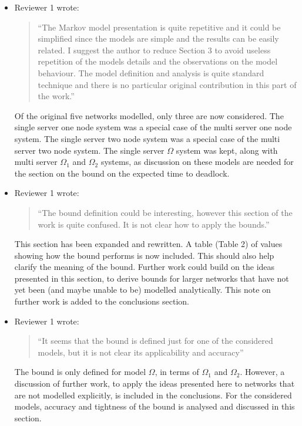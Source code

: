 \documentclass{article}
\begin{document}
\begin{itemize}

\item Reviewer 1 wrote:
\begin{quote}
``The Markov model presentation is quite repetitive and it could be simplified
since the models are simple and the results can be easily related.
I suggest the author to reduce Section 3 to avoid useless repetition of the
models details and the observations on the model behaviour.
The model definition and analysis is quite standard technique and there is no
particular original contribution in this part of the work.''
\end{quote}
Of the original five networks modelled, only three are now considered.
The single server one node system was a special case of the multi server one
node system.
The single server two node system was a special case of the multi server two
node system.
The single server $\Omega$ system was kept, along with multi server $\Omega_1$
and $\Omega_2$ systems, as discussion on these models are needed for the
section on the bound on the expected time to deadlock.


\item Reviewer 1 wrote:
\begin{quote}
``The bound definition could be interesting, however this section of the work
is quite confused.
It is not clear how to apply the bounds.''
\end{quote}
This section has been expanded and rewritten.
A table (Table 2) of values showing how the bound performs is now included.
This should also help clarify the meaning of the bound.
Further work could build on the ideas presented in this section, to derive
bounds for larger networks that have not yet been (and maybe unable to be)
modelled analytically.
This note on further work is added to the conclusions section.


\item Reviewer 1 wrote:
\begin{quote}
``It seems that the bound is defined just for one of the considered models,
but it is not clear its applicability and accuracy''
\end{quote}
The bound is only defined for model $\Omega$, in terms of $\Omega_1$ and
$\Omega_2$.
However, a discussion of further work, to apply the ideas presented here to
networks that are not modelled explicitly, is included in the conclusions.
For the considered models, accuracy and tightness of the bound is analysed and
discussed in this section.


\end{itemize}
\end{document}
